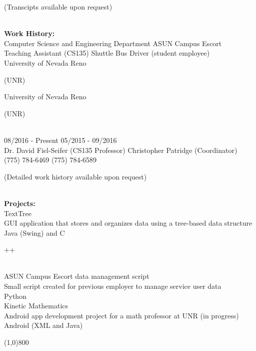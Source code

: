 \documentclass[8pt]{paper}
\begin{document}
\begin{flushleft}
\begin{small}(Transcipts available upon request)\end{small}\\
[2mm]

\large{\bfseries{Work History:}}\\
[2mm]

Computer Science and Engineering Department \hspace{24mm} ASUN Campus Escort\\
Teaching Assistant (CS135) \hspace{60.5mm} Shuttle Bus Driver (student employee)\\
University of Nevada Reno \begin{small}(UNR)
\end{small} \hspace{49.5mm} University of Nevada Reno \begin{small}(UNR)\end{small}\\
08/2016 - Present \hspace{78.5mm} 05/2015 - 09/2016\\
Dr. David Fiel-Seifer (CS135 Professor) \hspace{38.5mm} Christopher Patridge (Coordinator)\\
(775) 784-6469 \hspace{84mm} (775) 784-6589\\

\begin{small}(Detailed work history available upon request)\end{small}\\
[2mm]

\large{\bfseries{Projects:}}\\
[2mm]

TextTree\\
GUI application that stores and organizes data using a tree-based data structure\\
Java (Swing) and C\begin{small}++\end{small}\\
[2mm]

ASUN Campus Escort data management script\\
Small script created for previous employer to manage service user data\\
Python\\
[2mm]

Kinetic Mathematics\\
Android app development project for a math professor at UNR (in progress)\\
Android (XML and Java)\\
[2mm]


\end{flushleft}

\line(1,0){800}\\
\end{document}
